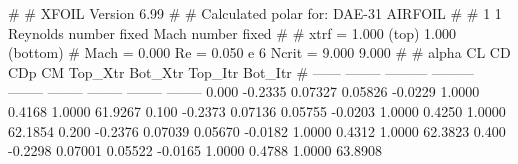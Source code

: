 #  
#       XFOIL         Version 6.99
#  
# Calculated polar for: DAE-31 AIRFOIL                                  
#  
# 1 1 Reynolds number fixed          Mach number fixed         
#  
# xtrf =   1.000 (top)        1.000 (bottom)  
# Mach =   0.000     Re =     0.050 e 6     Ncrit =   9.000  9.000
#  
#   alpha    CL        CD       CDp       CM     Top_Xtr  Bot_Xtr  Top_Itr  Bot_Itr
#  ------ -------- --------- --------- -------- -------- -------- -------- --------
   0.000  -0.2335   0.07327   0.05826  -0.0229   1.0000   0.4168   1.0000  61.9267
   0.100  -0.2373   0.07136   0.05755  -0.0203   1.0000   0.4250   1.0000  62.1854
   0.200  -0.2376   0.07039   0.05670  -0.0182   1.0000   0.4312   1.0000  62.3823
   0.400  -0.2298   0.07001   0.05522  -0.0165   1.0000   0.4788   1.0000  63.8908
